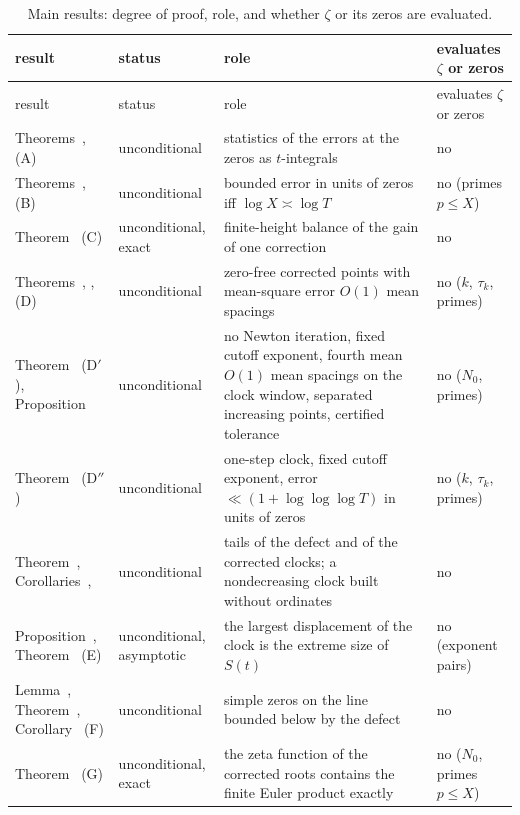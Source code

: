 \documentclass[preprint,12pt]{elsarticle}
\makeatletter
\let\CG@origref\ref
\newcommand{\CG@gettip}[1]{\@ifundefined{CGTip@#1}{Reference: #1}{\csname CGTip@#1\endcsname}}
\DeclareRobustCommand{\CGref}[1]{\pdftooltip{\CG@origref{#1}}{\CG@gettip{#1}}}
\numberwithin{equation}{section}
\theoremstyle{plain}
\theoremstyle{definition}
\theoremstyle{remark}
\newcommand{\NO}{N_0}
\makeatother
\begin{document}
\begin{center}
\footnotesize
\begin{longtable}{p{}p{}p{}p{}}
\caption{Main results: degree of proof, role, and whether $\zeta$ or its zeros are evaluated.}\label{tab:status}\\
\toprule
result & status & role & evaluates $\zeta$ or zeros\\
\midrule
\endfirsthead
\toprule
result & status & role & evaluates $\zeta$ or zeros\\
\midrule
\endhead
\bottomrule
\endfoot
Theorems~\CGref{thm:identity_general}, \CGref{thm:identity_g} (A) & unconditional & statistics of the errors at the zeros as $t$-integrals & no\\
Theorems~\CGref{thm:main}, \CGref{thm:variable_cutoff} (B) & unconditional & bounded error in units of zeros iff $\log X\asymp\log T$ & no (primes $p\le X$)\\
Theorem~\CGref{thm:accounting} (C) & unconditional, exact & finite-height balance of the gain of one correction & no\\
Theorems~\CGref{thm:computable_clock}, \CGref{thm:second_step}, \CGref{thm:uniform_iteration} (D) & unconditional & zero-free corrected points with mean-square error $O(1)$ mean spacings & no ($k$, $\tau_k$, primes)\\
Theorem~\CGref{thm:regularized_clock} (D$'$), Proposition~\CGref{prop:tolerance} & unconditional & no Newton iteration, fixed cutoff exponent, fourth mean $O(1)$ mean spacings on the clock window, separated increasing points, certified tolerance & no ($\NO$, primes)\\
Theorem~\CGref{thm:fixed_cutoff_step} (D$''$) & unconditional & one-step clock, fixed cutoff exponent, error $\ll(1+\log\log\log T)$ in units of zeros & no ($k$, $\tau_k$, primes)\\
Theorem~\CGref{thm:tails}, Corollaries~\CGref{cor:clock_tails}, \CGref{cor:sorted_clock} & unconditional & tails of the defect and of the corrected clocks; a nondecreasing clock built without ordinates & no\\
Proposition~\CGref{prop:envelope_equivalence}, Theorem~\CGref{thm:envelope} (E) & unconditional, asymptotic & the largest displacement of the clock is the extreme size of $S(t)$ & no (exponent pairs)\\
Lemma~\CGref{lem:mult_ordinate}, Theorem~\CGref{thm:simple_certificate}, Corollary~\CGref{cor:simple_Q} (F) & unconditional & simple zeros on the line bounded below by the defect & no\\
Theorem~\CGref{thm:euler_product} (G) & unconditional, exact & the zeta function of the corrected roots contains the finite Euler product exactly & no ($\NO$, primes $p\le X$)\\
\end{longtable}
\end{center}
\end{document}
